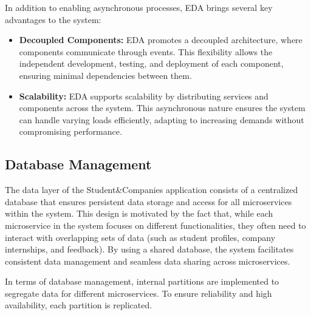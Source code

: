 In addition to enabling asynchronous processes, EDA brings several key advantages to the system:

\begin{itemize}
    \item \textbf{Decoupled Components:} EDA promotes a decoupled architecture, where components communicate through events. This flexibility allows the independent development, testing, and deployment of each component, ensuring minimal dependencies between them.
    \item \textbf{Scalability:} EDA supports scalability by distributing services and components across the system. This asynchronous nature ensures the system can handle varying loads efficiently, adapting to increasing demands without compromising performance.
\end{itemize}

\subsection{Database Management}

The data layer of the Student\&Companies application consists of a centralized database that ensures persistent data storage and access for all microservices within the system. This design is motivated by the fact that, while each microservice in the system focuses on different functionalities, they often need to interact with overlapping sets of data (such as student profiles, company internships, and feedback). By using a shared database, the system facilitates consistent data management and seamless data sharing across microservices.

In terms of database management, internal partitions are implemented to segregate data for different microservices. To ensure reliability and high availability, each partition is replicated.